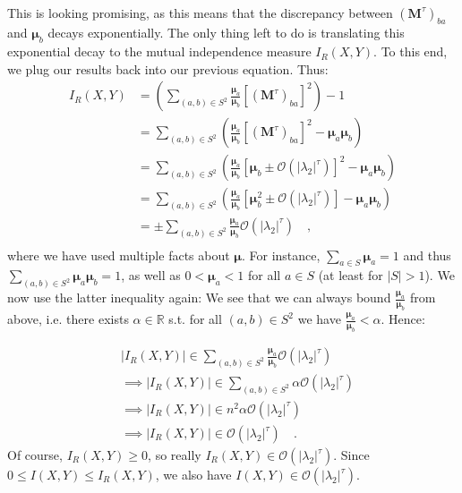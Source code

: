 \documentclass[../../main.tex]{subfiles}
\begin{document}
    ~\\
    This is looking promising, as this means that the discrepancy between $(\boldsymbol{M}^\tau)_{ba}$ and $\boldsymbol{\mu}_b$ decays exponentially. The only thing left to do is translating this exponential decay to the mutual independence measure $I_R(X, Y)$. To this end, we plug our results back into our previous equation. Thus:
    \begin{align*}
        I_R(X, Y) &= \left( \sum_{(a,b) \in S^2} \frac{\boldsymbol{\mu}_a}{\boldsymbol{\mu}_b} \left[ (\boldsymbol{M}^{\tau})_{ba} \right] ^2 \right) - 1 \\
        &= \sum_{(a,b) \in S^2} \left( \frac{\boldsymbol{\mu}_a}{\boldsymbol{\mu}_b} \left[ (\boldsymbol{M}^{\tau})_{ba} \right] ^2 - \boldsymbol{\mu}_a \boldsymbol{\mu}_b \right) \\
        &= \sum_{(a,b) \in S^2} \left( \frac{\boldsymbol{\mu}_a}{\boldsymbol{\mu}_b} \left[ \boldsymbol{\mu}_b \pm \mathcal{O}(|\lambda_2|^\tau) \right] ^2 - \boldsymbol{\mu}_a \boldsymbol{\mu}_b \right) \\
        &= \sum_{(a,b) \in S^2} \left( \frac{\boldsymbol{\mu}_a}{\boldsymbol{\mu}_b} \left[ \boldsymbol{\mu}_b^2 \pm \mathcal{O}(|\lambda_2|^\tau) \right] - \boldsymbol{\mu}_a \boldsymbol{\mu}_b \right) \\
        &= \pm \sum_{(a,b) \in S^2} \frac{\boldsymbol{\mu}_a}{\boldsymbol{\mu}_b} \mathcal{O}(|\lambda_2|^\tau) \quad , \\
    \end{align*}
    where we have used multiple facts about $\boldsymbol{\mu}$. For instance, $\sum_{a \in S} \boldsymbol{\mu}_a = 1$ and thus $\sum_{(a,b) \in S^2} \boldsymbol{\mu}_a \boldsymbol{\mu}_b = 1$, as well as $0 < \boldsymbol{\mu}_a < 1$ for all $a \in S$ (at least for $|S| > 1$). We now use the latter inequality again: We see that we can always bound $\frac{\boldsymbol{\mu}_a}{\boldsymbol{\mu}_b}$ from above, i.e. there exists $\alpha \in \mathbb{R}$ s.t. for all $(a,b) \in S^2$ we have $\frac{\boldsymbol{\mu}_a}{\boldsymbol{\mu}_b} < \alpha$. Hence:

    \begin{align*}
        &|I_R(X, Y)| \in \sum_{(a,b) \in S^2} \frac{\boldsymbol{\mu}_a}{\boldsymbol{\mu}_b} \mathcal{O}(|\lambda_2|^\tau) \\
        &\implies |I_R(X, Y)| \in \sum_{(a,b) \in S^2} \alpha \mathcal{O}(|\lambda_2|^\tau) \\
        &\implies |I_R(X, Y)| \in n^2 \alpha \mathcal{O}(|\lambda_2|^\tau) \\
        &\implies |I_R(X, Y)| \in \mathcal{O}(|\lambda_2|^\tau) \quad .
    \end{align*}
    Of course, $I_R(X, Y) \geq 0$, so really $I_R(X, Y) \in \mathcal{O}(|\lambda_2|^\tau)$. Since $0 \leq I(X, Y) \leq I_R(X, Y)$, we also have $I(X, Y) \in \mathcal{O}(|\lambda_2|^\tau)$.
\end{document}
